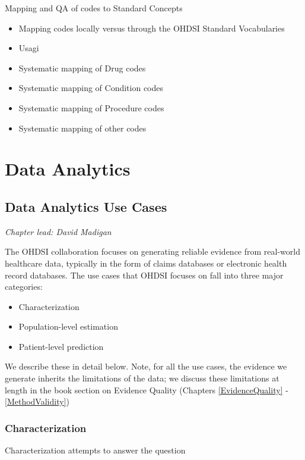 \documentclass[11pt]{book}
\providecommand{\tightlist}{%
  \setlength{\itemsep}{0pt}\setlength{\parskip}{0pt}}
\begin{document}
Mapping and QA of codes to Standard Concepts

\begin{itemize}
\tightlist
\item
  Mapping codes locally versus through the OHDSI Standard Vocabularies
\item
  Usagi
\item
  Systematic mapping of Drug codes
\item
  Systematic mapping of Condition codes
\item
  Systematic mapping of Procedure codes
\item
  Systematic mapping of other codes
\end{itemize}

\part{Data Analytics}\label{part-data-analytics}

\chapter{Data Analytics Use Cases}\label{DataAnalyticsUseCases}

\emph{Chapter lead: David Madigan}

The OHDSI collaboration focuses on generating reliable evidence from
real-world healthcare data, typically in the form of claims databases or
electronic health record databases. The use cases that OHDSI focuses on
fall into three major categories:

\begin{itemize}
\tightlist
\item
  Characterization
\item
  Population-level estimation
\item
  Patient-level prediction
\end{itemize}

We describe these in detail below. Note, for all the use cases, the
evidence we generate inherits the limitations of the data; we discuss
these limitations at length in the book section on Evidence Quality
(Chapters \ref{EvidenceQuality} - \ref{MethodValidity})

\section{Characterization}\label{characterization}

Characterization attempts to answer the question
\end{document}
